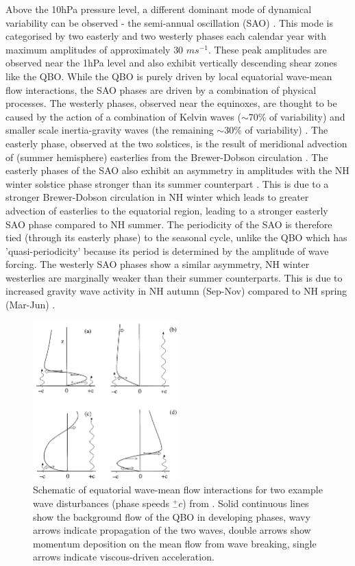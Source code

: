 Above the 10hPa pressure level, a different dominant mode of dynamical variability can be observed - the semi-annual oscillation (SAO) \citep{garcia}. This mode is categorised by two easterly and two westerly phases each calendar year with maximum amplitudes of approximately 30 $ms^{-1}$. These peak amplitudes are observed near the 1hPa level and also exhibit vertically descending shear zones like the QBO. While the QBO is purely driven by local equatorial wave-mean flow interactions, the SAO phases are driven by a combination of physical processes. The westerly phases, observed near the equinoxes, are thought to be caused by the action of a combination of Kelvin waves ($\sim$70\% of variability) and smaller scale inertia-gravity waves (the remaining $\sim$30\% of variability) \citep{dunkertonRole1979,hitchmanEstimation1988}. The easterly phase, observed at the two solstices, is the result of meridional advection of (summer hemisphere) easterlies from the Brewer-Dobson circulation \citep{holtonNumerical1980}. The easterly phases of the SAO also exhibit an asymmetry in amplitudes with the NH winter solstice phase stronger than its summer counterpart \citep{dunkertonRole1979}. This is due to a stronger Brewer-Dobson circulation in NH winter which leads to greater advection of easterlies to the equatorial region, leading to a stronger easterly SAO phase compared to NH summer. The periodicity of the SAO is therefore tied (through its easterly phase) to the seasonal cycle, unlike the QBO which has 'quasi-periodicity' because its period is determined by the amplitude of wave forcing. The westerly SAO phases show a similar asymmetry, NH winter westerlies are marginally weaker than their summer counterparts. This is due to increased gravity wave activity in NH autumn (Sep-Nov) compared to NH spring (Mar-Jun) \citep{rayAnalysis1998}. 

\begin{figure}[h!]
\centering
    \includegraphics[width=0.5\textwidth]{Figures/Figures-background/Schematic_of_QBO_waves.png}
    \caption[Schematic of equatorial wave-mean flow interactions.]{Schematic of equatorial wave-mean flow interactions for two example wave disturbances (phase speeds $^+_- c$) from \cite{plumbQuasibiennial1984}. Solid continuous lines show the background flow of the QBO in developing phases, wavy arrows indicate propagation of the two waves, double arrows show momentum deposition on the mean flow from wave breaking, single arrows indicate viscous-driven acceleration.}
    \label{fig:QBO_wave_schematic}
\centering
\end{figure}

